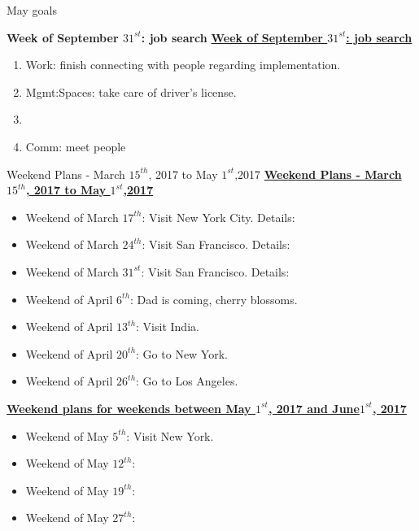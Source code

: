 \begin{columns}
\begin{column}{0.5\columnwidth}
\begin{block}{May goals}
\ifdefined\POSTER
\end{block}
\fi

\ifdefined\POSTER
\begin{block}{\small \bf Week of September $31^{st}$: job search}
\else
\underline{\bf Week of September $31^{st}$: job search}\\
\fi

\begin{enumerate}
\tiny \item \tiny Work: finish connecting with people regarding implementation. 
\item \tiny Mgmt:Spaces: take care of driver's license. 
\item \tiny 
\item \tiny Comm: meet people 
\end{enumerate}

\ifdefined\POSTER
\end{block}
\fi

\ifdefined\POSTER
\begin{block}{Weekend Plans - March $15^{th}$, 2017 to May $1^{st}$,2017} 
\else
{\underline{\bf Weekend Plans - March $15^{th}$, 2017 to May $1^{st}$,2017}}\\ 
\fi
\begin{itemize}
\item \tiny Weekend of March $17^{th}$: Visit New York City. Details:
\item \tiny Weekend of March $24^{th}$: Visit San Francisco. Details:
\item \tiny Weekend of March $31^{st}$: Visit San Francisco. Details:
\item \tiny Weekend of April $6^{th}$:  Dad is coming, cherry
  blossoms.
\item \tiny Weekend of April $13^{th}$: Visit India.
\item \tiny Weekend of April $20^{th}$: Go to New York.
\item \tiny Weekend of April $26^{th}$: Go to Los Angeles.
\end{itemize}

{\underline{\bf  Weekend plans for weekends between May $1^{st}$, 2017
    and June$1^{st}$, 2017}}\\
\begin{itemize}
\item \tiny Weekend of May $5^{th}$: Visit New York.
\item \tiny Weekend of May $12^{th}$:
\item \tiny Weekend of May $19^{th}$:
\item \tiny Weekend of May $27^{th}$:
\end{itemize}


\end{block}
\end{column}
\end{columns}

